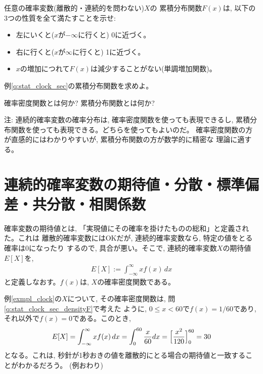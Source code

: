 \begin{q}\label{q:stat_dist_increase} 任意の確率変数(離散的・連続的を問わない)$X$の
累積分布関数$F(x)$は, 以下の3つの性質を全て満たすことを示せ:
\begin{itemize}
\item 左にいくと($x$が$-\infty$に行くと) 0に近づく。
\item 右に行くと($x$が$\infty$に行くと) 1に近づく。
\item $x$の増加につれて$F(x)$は減少することがない(単調増加関数)。
\end{itemize}
\end{q}

\begin{q}\label{q:stat_clock_accum} 例\ref{q:stat_clock_sec}の累積分布関数を求めよ。\end{q}\mv

\begin{q}\label{q:stat_densityF_distF} 確率密度関数とは何か? 累積分布関数とは何か?\end{q}
\mv

{\small 注: 連続的確率変数の確率分布は, 確率密度関数を使っても表現できるし, 
累積分布関数を使っても表現できる。どちらを使ってもよいのだ。
確率密度関数の方が直感的にはわかりやすいが, 累積分布関数の方が数学的に精密な
理論に適する。}
\vv


\section{連続的確率変数の期待値・分散・標準偏差・共分散・相関係数}

確率変数の期待値とは, 「実現値にその確率を掛けたものの総和」と定義された。これは
離散的確率変数にはOKだが, 連続的確率変数なら, 特定の値をとる確率は0になったり
するので, 具合が悪い。そこで, 連続的確率変数$X$の期待値$E[X]$を, 
\begin{eqnarray}
E[X]:=\int_{-\infty}^{\infty}xf(x)\,dx\label{eq:def_expect_contX}
\end{eqnarray}
と定義しなおす。$f(x)$は, $X$の確率密度関数である。\\

\begin{exmpl}
例\ref{exmpl_clock}の$X$について, その確率密度関数は, 問\ref{q:stat_clock_sec_densityF}で考えた
ように, $0\leq x < 60$で$f(x)=1/60$であり, それ以外で$f(x)=0$である。このとき, 
\begin{eqnarray*}
E[X]=\int_{-\infty}^{\infty}xf(x)\,dx=\int_{0}^{60}\frac{x}{60}dx=\Bigl[\frac{x^2}{120}\Bigr]_{0}^{60}=30
\end{eqnarray*}
となる。これは, 秒針が1秒おきの値を離散的にとる場合の期待値と一致することがわかるだろう。
(例おわり)\end{exmpl}

